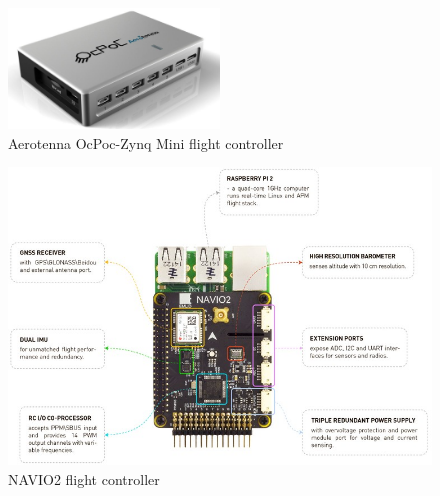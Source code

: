 \begin{figure}[!hbt]
  \centering
  \includegraphics[width=0.5\textwidth]{./img/png/hw-ocpoc-zynq-mini.png} 
  \caption{Aerotenna OcPoc-Zynq Mini flight controller~\cite{ocpoc}}%
  \label{fig:hw-ocpoc}
\end{figure}

\begin{figure}[!hbt]
  \centering
  \includegraphics[width=1.0\textwidth]{./img/png/osh-NAVIO2.png} 
  \caption{NAVIO2 flight controller~\cite{arduPilot-Navio2}}%
  \label{fig:osh-NAVIO2}
\end{figure}

\begin{figure}[!hbt]
  \centering
\end{figure}


